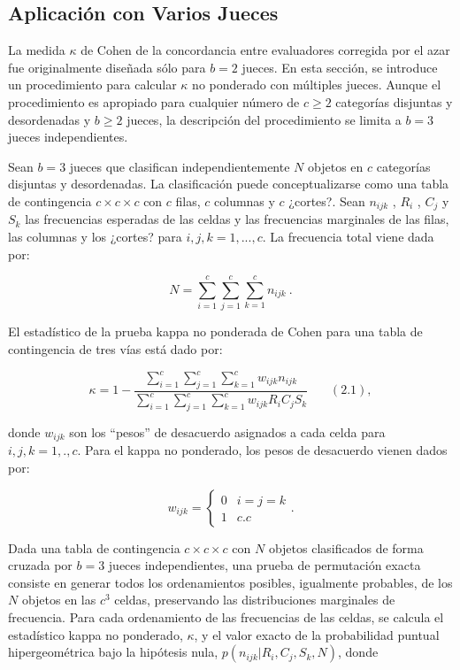 \documentclass[12pt,a4paper,]{book}
\numberwithin{dummy}{section}
\theoremstyle{ocrenumbox}
\theoremstyle{blacknumex}
\theoremstyle{blacknumbox}
\theoremstyle{ocrenum}
\theoremstyle{ocrenum}
\begin{document}
\hypertarget{aplicaciuxf3n-con-varios-jueces}{%
\subsection{Aplicación con Varios
Jueces}\label{aplicaciuxf3n-con-varios-jueces}}

La medida \(\kappa\) de Cohen de la concordancia entre evaluadores
corregida por el azar fue originalmente diseñada sólo para \(b = 2\)
jueces. En esta sección, se introduce un procedimiento para calcular
\(\kappa\) no ponderado con múltiples jueces. Aunque el procedimiento es
apropiado para cualquier número de \(c \ge 2\) categorías disjuntas y
desordenadas y \(b \ge 2\) jueces, la descripción del procedimiento se
limita a \(b = 3\) jueces independientes.

Sean \(b = 3\) jueces que clasifican independientemente \(N\) objetos en
\(c\) categorías disjuntas y desordenadas. La clasificación puede
conceptualizarse como una tabla de contingencia \(c\times c\times c\)
con \(c\) filas, \(c\) columnas y \(c\) ¿cortes?. Sean \(n_{ijk}\) ,
\(R_i\) , \(C_j\) y \(S_k\) las frecuencias esperadas de las celdas y
las frecuencias marginales de las filas, las columnas y los ¿cortes?
para \(i, j, k = 1, . . . , c\). La frecuencia total viene dada por:

\[
N=\sum_{i=1}^c\sum_{j=1}^c\sum_{k=1}^cn_{ijk}~.
\]

El estadístico de la prueba kappa no ponderada de Cohen para una tabla
de contingencia de tres vías está dado por:

\[
\kappa=1-\frac{\displaystyle\sum_{i=1}^c\sum_{j=1}^c\sum_{k=1}^cw_{ijk}n_{ijk}}{\displaystyle\sum_{i=1}^c\sum_{j=1}^c\sum_{k=1}^cw_{ijk}R_iC_jS_k}~~~~~~~~(2.1),
\]

donde \(w_{ijk}\) son los ``pesos'' de desacuerdo asignados a cada celda
para \(i, j, k = 1, . , c\). Para el kappa no ponderado, los pesos de
desacuerdo vienen dados por:

\[
w_{ijk}=\begin{cases}0 & i = j=k\\1 & c.c\end{cases}.
\]

Dada una tabla de contingencia \(c\times c\times c\) con \(N\) objetos
clasificados de forma cruzada por \(b = 3\) jueces independientes, una
prueba de permutación exacta consiste en generar todos los ordenamientos
posibles, igualmente probables, de los \(N\) objetos en las \(c^3\)
celdas, preservando las distribuciones marginales de frecuencia. Para
cada ordenamiento de las frecuencias de las celdas, se calcula el
estadístico kappa no ponderado, \(\kappa\), y el valor exacto de la
probabilidad puntual hipergeométrica bajo la hipótesis nula,
\(p(n_{ijk} |R_i,C_j, S_k,N)\), donde
\end{document}
